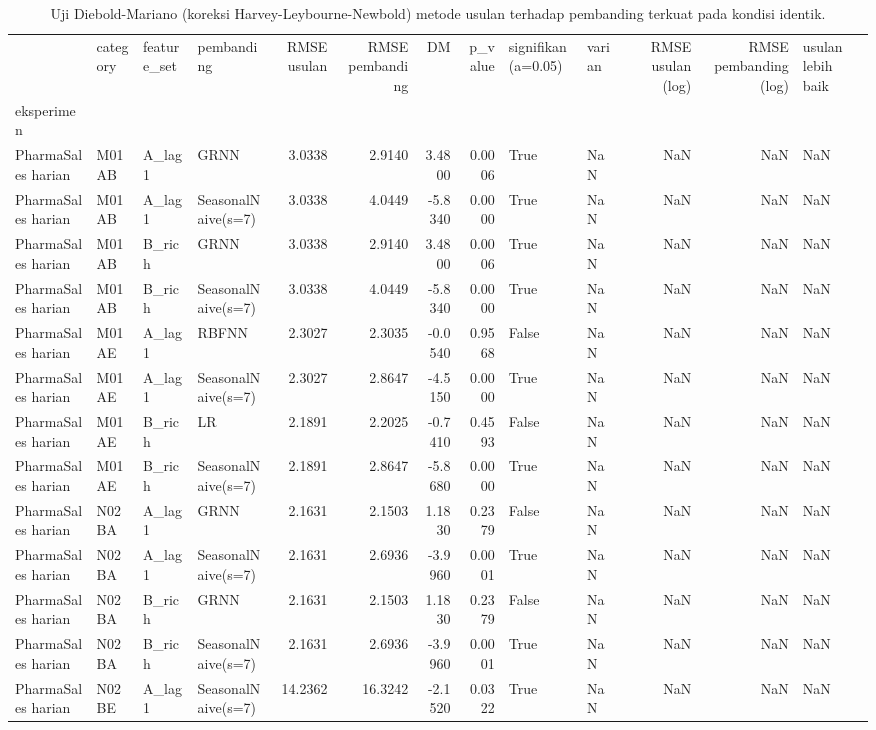\begin{table}
\caption{Uji Diebold-Mariano (koreksi Harvey-Leybourne-Newbold) metode usulan terhadap pembanding terkuat pada kondisi identik.}
\label{tab:tab4_diebold_mariano}
\begin{tabular}{llllrrrrllrrl}
\toprule
 & category & feature\_set & pembanding & RMSE usulan & RMSE pembanding & DM & p\_value & signifikan (a=0.05) & varian & RMSE usulan (log) & RMSE pembanding (log) & usulan lebih baik \\
eksperimen &  &  &  &  &  &  &  &  &  &  &  &  \\
\midrule
PharmaSales harian & M01AB & A\_lag1 & GRNN & 3.0338 & 2.9140 & 3.4800 & 0.0006 & True & NaN & NaN & NaN & NaN \\
PharmaSales harian & M01AB & A\_lag1 & SeasonalNaive(s=7) & 3.0338 & 4.0449 & -5.8340 & 0.0000 & True & NaN & NaN & NaN & NaN \\
PharmaSales harian & M01AB & B\_rich & GRNN & 3.0338 & 2.9140 & 3.4800 & 0.0006 & True & NaN & NaN & NaN & NaN \\
PharmaSales harian & M01AB & B\_rich & SeasonalNaive(s=7) & 3.0338 & 4.0449 & -5.8340 & 0.0000 & True & NaN & NaN & NaN & NaN \\
PharmaSales harian & M01AE & A\_lag1 & RBFNN & 2.3027 & 2.3035 & -0.0540 & 0.9568 & False & NaN & NaN & NaN & NaN \\
PharmaSales harian & M01AE & A\_lag1 & SeasonalNaive(s=7) & 2.3027 & 2.8647 & -4.5150 & 0.0000 & True & NaN & NaN & NaN & NaN \\
PharmaSales harian & M01AE & B\_rich & LR & 2.1891 & 2.2025 & -0.7410 & 0.4593 & False & NaN & NaN & NaN & NaN \\
PharmaSales harian & M01AE & B\_rich & SeasonalNaive(s=7) & 2.1891 & 2.8647 & -5.8680 & 0.0000 & True & NaN & NaN & NaN & NaN \\
PharmaSales harian & N02BA & A\_lag1 & GRNN & 2.1631 & 2.1503 & 1.1830 & 0.2379 & False & NaN & NaN & NaN & NaN \\
PharmaSales harian & N02BA & A\_lag1 & SeasonalNaive(s=7) & 2.1631 & 2.6936 & -3.9960 & 0.0001 & True & NaN & NaN & NaN & NaN \\
PharmaSales harian & N02BA & B\_rich & GRNN & 2.1631 & 2.1503 & 1.1830 & 0.2379 & False & NaN & NaN & NaN & NaN \\
PharmaSales harian & N02BA & B\_rich & SeasonalNaive(s=7) & 2.1631 & 2.6936 & -3.9960 & 0.0001 & True & NaN & NaN & NaN & NaN \\
PharmaSales harian & N02BE & A\_lag1 & SeasonalNaive(s=7) & 14.2362 & 16.3242 & -2.1520 & 0.0322 & True & NaN & NaN & NaN & NaN \\

\end{tabular}
\end{table}
